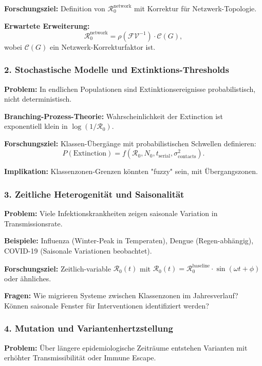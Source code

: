 ﻿\documentclass[a4paper,12pt,twoside]{article}
\theoremstyle{definition}
\begin{document}
\textbf{Forschungsziel:} Definition von $\mathcal{R}_0^{\text{network}}$ mit Korrektur für Netzwerk-Topologie.

\textbf{Erwartete Erweiterung:} 
\[
\mathcal{R}_0^{\text{network}} = \rho(\mathcal{F}\mathcal{V}^{-1}) \cdot \mathcal{C}(G),
\]
wobei $\mathcal{C}(G)$ ein Netzwerk-Korrekturfaktor ist.

\subsubsection{2. Stochastische Modelle und Extinktions-Thresholds}

\textbf{Problem:} In endlichen Populationen sind Extinktionsereignisse probabilistisch, nicht deterministisch.

\textbf{Branching-Prozess-Theorie:} Wahrscheinlichkeit der Extinction ist exponentiell klein in $\log(1/\mathcal{R}_0)$.

\textbf{Forschungsziel:} Klassen-Übergänge mit probabilistischen Schwellen definieren:
\[
P(\text{Extinction}) = f(\mathcal{R}_0, N_0, t_{\text{serial}}, \sigma^2_{\text{contacts}}).
\]

\textbf{Implikation:} Klassenzonen-Grenzen könnten "fuzzy" sein, mit Übergangszonen.

\subsubsection{3. Zeitliche Heterogenität und Saisonalität}

\textbf{Problem:} Viele Infektionskrankheiten zeigen saisonale Variation in Transmissionsrate.

\textbf{Beispiele:} Influenza (Winter-Peak in Temperaten), Dengue (Regen-abhängig), COVID-19 (Saisonale Variationen beobachtet).

\textbf{Forschungsziel:} Zeitlich-variable $\mathcal{R}_0(t)$ mit $\mathcal{R}_0(t) = \mathcal{R}_0^{\text{baseline}} \cdot \sin(\omega t + \phi)$ oder ähnliches.

\textbf{Fragen:} Wie migrieren Systeme zwischen Klassenzonen im Jahresverlauf? Können saisonale Fenster für Interventionen identifiziert werden?

\subsubsection{4. Mutation und Variantenhertzstellung}

\textbf{Problem:} Über längere epidemiologische Zeiträume entstehen Varianten mit erhöhter Transmissibilität oder Immune Escape.
\end{document}
